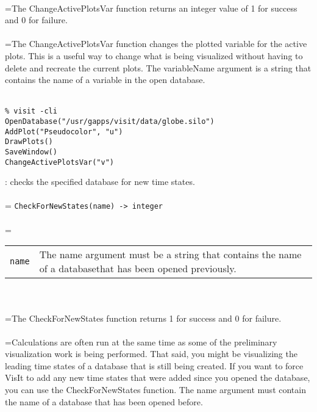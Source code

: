 \documentclass[10pt,a4paper]{report}
\begin{document}
 \\ 
\hangindent=\parindent The ChangeActivePlotsVar function returns an integer value of 1 for success and 0 for failure. \\[-3mm] 

 \\ 
\hangindent=\parindent The ChangeActivePlotsVar function changes the plotted variable for the active plots. This is a useful way to change what is being visualized without having to delete and recreate the current plots. The variableName argument is a string that contains the name of a variable in the open database. \\[-3mm] 

\\[-6mm]
\begin{verbatim}% visit -cli
OpenDatabase("/usr/gapps/visit/data/globe.silo")
AddPlot("Pseudocolor", "u")
DrawPlots()
SaveWindow()
ChangeActivePlotsVar("v")
\end{verbatim}
\newpage


{}
: checks the specified database for new time states.\\[-3mm]

 \\ 
\hangindent=\parindent 
\verb!CheckForNewStates(name) -> integer!\\ [-3mm]

 \\ 
\hangindent=\parindent 
\begin{tabular}{lp{9cm}}
\verb!name! & The name argument must be a string that contains the name of a databasethat has been opened previously. \\
\end{tabular} \\[-2mm]


 \\ 
\hangindent=\parindent The CheckForNewStates function returns 1 for success and 0 for failure. \\[-3mm] 

 \\ 
\hangindent=\parindent Calculations are often run at the same time as some of the preliminary visualization work is being performed. That said, you might be visualizing the leading time states of a database that is still being created. If you want to force VisIt to add any new time states that were added since you opened the database, you can use the CheckForNewStates function. The name argument must contain the name of a database that has been opened before. \\[-3mm] 
\end{document}
